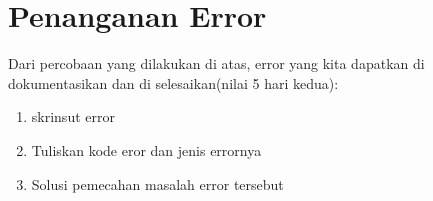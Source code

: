 \section{Penanganan Error}
Dari percobaan yang dilakukan di atas, error yang kita dapatkan di dokumentasikan dan di selesaikan(nilai 5 hari kedua):

\begin{enumerate}
	\item
skrinsut error
	\item
Tuliskan kode eror dan jenis errornya
	\item
Solusi pemecahan masalah error tersebut

\end{enumerate}


